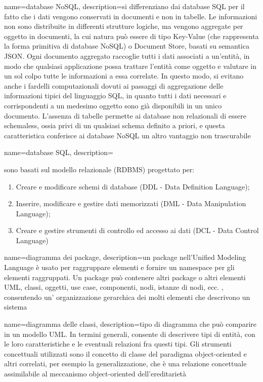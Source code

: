 \hypertarget{D}{}

{
	name=database NoSQL,
	description={si differenziano dai database SQL per il fatto che i dati vengono conservati in documenti e non in tabelle. Le informazioni non sono distribuite in differenti strutture logiche, ma vengono aggregate per oggetto in documenti, la cui natura può essere di tipo Key-Value (che rappresenta la forma primitiva di database NoSQL) o Document Store, basati su semantica JSON. Ogni documento aggregato raccoglie tutti i dati associati a un’entità, in modo che qualsiasi applicazione possa trattare l’entità come oggetto e valutare in un sol colpo tutte le informazioni a essa correlate. In questo modo, si evitano anche i fardelli computazionali dovuti ai passaggi di aggregazione delle informazioni tipici del linguaggio SQL, in quanto tutti i dati necessari e corrispondenti a un medesimo oggetto sono già disponibili in un unico documento. L’assenza di tabelle permette ai database non relazionali di essere schemaless, ossia privi di un qualsiasi schema definito a priori, e questa caratteristica conferisce ai database NoSQL un altro vantaggio non trascurabile}
}

{
	name=database SQL,
	description={sono basati sul modello relazionale (RDBMS) progettato per:
		\begin{enumerate}  
			\item Creare e modificare schemi di database (DDL - Data Definition Language);
			\item Inserire, modificare e gestire dati memorizzati (DML - Data Manipulation Language);
			\item Creare e gestire strumenti di controllo ed accesso ai dati (DCL - Data Control Language)
		\end{enumerate}
	}
}

{
	name=diagramma dei package,
	description={un package nell'Unified Modeling Language \`{e} usato per raggruppare elementi e fornire un namespace per gli elementi raggruppati. Un package può contenere altri package o altri elementi UML, classi, oggetti, use case, componenti, nodi, istanze di nodi, ecc. , consentendo un' organizzazione gerarchica dei molti elementi che descrivono un sistema}
}

{
	name=diagramma delle classi,
	description={tipo di diagramma che può comparire in un modello UML. In termini generali, consente di descrivere tipi di entità, con le loro caratteristiche e le eventuali relazioni fra questi tipi. Gli strumenti concettuali utilizzati sono il concetto di classe del paradigma object-oriented e altri correlati, per esempio la generalizzazione, che è una relazione concettuale assimilabile al meccanismo object-oriented dell'ereditarietà}
}

